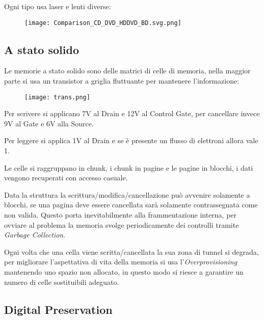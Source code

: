 \documentclass{article}
\begin{document}
\noindent Ogni tipo usa laser e lenti diverse:

\begin{figure}[ht]
    \centering
    \texttt{[image: Comparison\_CD\_DVD\_HDDVD\_BD.svg.png]}
    \label{fig:cd3}
\end{figure}

\newpage

\subsection{A stato solido}

Le memorie a stato solido sono delle matrici di celle di memoria, nella maggior parte si usa un transistor a griglia fluttuante per mantenere l'informazione:

\begin{figure}[ht]
    \centering
    \texttt{[image: trans.png]}
    \label{fig:transistor}
\end{figure}

\noindent Per scrivere si applicano 7V al Drain e 12V al Control Gate, per cancellare invece 9V al Gate e 6V alla Source.\newline

\noindent Per leggere si applica 1V al Drain e se è presente un flusso di elettroni allora vale 1.\newline

\noindent Le celle si raggruppano in chunk, i chunk in pagine e le pagine in blocchi, i dati vengono recuperati con accesso casuale.\newline

\noindent Data la struttura la scrittura/modifica/cancellazione può avvenire solamente a blocchi, se una pagina deve essere cancellata sarà solamente contrassegnata come non valida. Questo porta inevitabilmente alla frammentazione interna, per ovviare al problema la memoria svolge periodicamente dei controlli tramite \textit{Garbage Collection}.\newline

\noindent Ogni volta che una cella viene scritta/cancellata la sua zona di tunnel si degrada, per migliorare l'aspettativa di vita della memoria si usa l'\textit{Overprovisioning} mantenendo uno spazio non allocato, in questo modo si riesce a garantire un numero di celle sostituibili adeguato.\newline

\newpage

\subsection{Digital Preservation}
\end{document}
